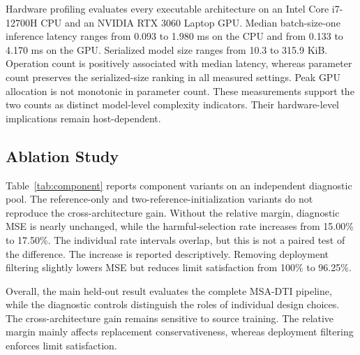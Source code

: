 \documentclass[a4paper,fleqn]{cas-sc}
\begin{document}
Hardware profiling evaluates every executable architecture on an Intel Core
i7-12700H CPU and an NVIDIA RTX 3060 Laptop GPU. Median batch-size-one
inference latency ranges from 0.093 to 1.980 ms on the CPU and from 0.133 to
4.170 ms on the GPU. Serialized model size ranges from 10.3 to 315.9 KiB.
Operation count is positively associated with median latency, whereas
parameter count preserves the serialized-size ranking in all measured
settings. Peak GPU allocation is not monotonic in parameter count. These
measurements support the two counts as distinct model-level complexity
indicators. Their hardware-level implications remain host-dependent.

\subsection{Ablation Study}
\label{subsec:component}

Table~\ref{tab:component} reports component variants on an independent
diagnostic pool. The reference-only and two-reference-initialization variants
do not reproduce the cross-architecture gain. Without the relative margin,
diagnostic MSE is nearly unchanged, while the harmful-selection rate increases
from 15.00\% to 17.50\%. The individual rate intervals overlap, but this is
not a paired test of the difference. The increase is reported descriptively. Removing deployment
filtering slightly lowers MSE but reduces limit satisfaction from 100\% to
96.25\%.

Overall, the main held-out result evaluates the complete MSA-DTI pipeline,
while the diagnostic controls distinguish the roles of individual design
choices. The cross-architecture gain remains sensitive to source training. The
relative margin mainly affects replacement conservativeness, whereas
deployment filtering enforces limit satisfaction.
\end{document}
